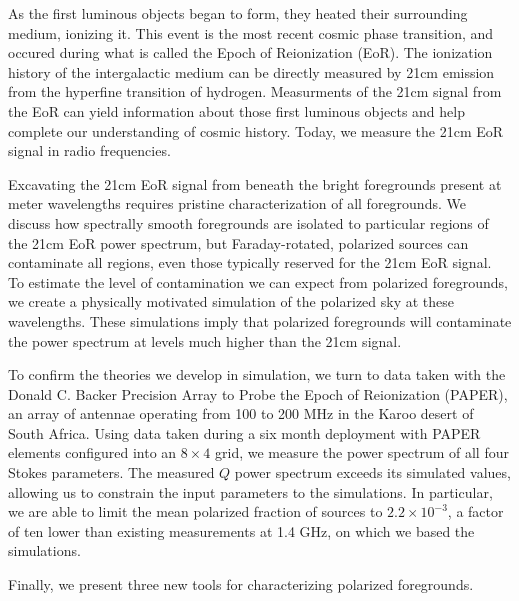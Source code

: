 

\begin{abstracts}

  As the first luminous objects began to form, they heated their surrounding medium, ionizing it. 
  This event is the most recent cosmic phase transition, and occured during what is called the 
  Epoch of Reionization (EoR). The ionization history of the intergalactic medium can be directly 
  measured by 21cm emission from the hyperfine transition of hydrogen. Measurments of the 21cm signal
  from the EoR can yield information about those first luminous objects and help complete our
  understanding of cosmic history. Today, we measure the 21cm EoR signal in radio frequencies. 

  Excavating the 21cm EoR signal from beneath the bright foregrounds present at meter wavelengths
  requires pristine characterization of all foregrounds. We discuss how spectrally smooth foregrounds
  are isolated to particular regions of the 21cm EoR power spectrum, but Faraday-rotated, polarized
  sources can contaminate all regions, even those typically reserved for the 21cm EoR signal. To
  estimate the level of contamination we can expect from polarized foregrounds, we create a
  physically motivated simulation of the polarized sky at these wavelengths. These simulations imply
  that polarized foregrounds will contaminate the power spectrum at levels much higher than the 21cm
  signal.

  To confirm the theories we develop in simulation, we turn to data taken with the Donald C. Backer
  Precision Array to Probe the Epoch of Reionization (PAPER), an array of antennae operating from 100 to 200 
  MHz in the Karoo desert of South Africa. Using data taken during a six month deployment with PAPER
  elements configured into an $8\times4$ grid, we measure the power spectrum of all four Stokes
  parameters. The measured $Q$ power spectrum exceeds its simulated values, allowing us to constrain the 
  input parameters to the simulations. In particular, we are able to limit the mean polarized
  fraction of sources to $2.2\times10^{-3}$, a factor of ten lower than existing measurements at 1.4
  GHz, on which we based the simulations.

  Finally, we present three new tools for characterizing polarized foregrounds.

\end{abstracts}

